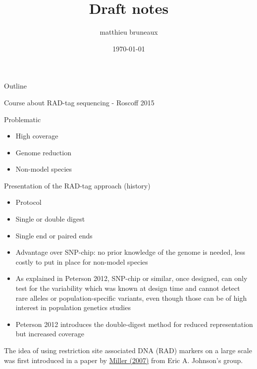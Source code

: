 \documentclass[presentation]{beamer}
\author{matthieu bruneaux}
\date{\today}
\title{Draft notes}
\begin{document}
\maketitle
\begin{frame}{Outline}
\tableofcontents
\end{frame}


\begin{frame}[label=sec-1]{Course about RAD-tag sequencing - Roscoff 2015}
\begin{block}{Problematic}
\begin{itemize}
\item High coverage
\item Genome reduction
\item Non-model species
\end{itemize}
\end{block}
\begin{block}{Presentation of the RAD-tag approach (history)}
\begin{itemize}
\item Protocol
\item Single or double digest
\item Single end or paired ends
\item Advantage over SNP-chip: no prior knowledge of the genome is needed, less
costly to put in place for non-model species
\item As explained in Peterson 2012, SNP-chip or similar, once designed, can only
test for the variability which was known at design time and cannot detect
rare alleles or population-specific variants, even though those can be of
high interest in population genetics studies
\item Peterson 2012 introduces the double-digest method for reduced representation
but increased coverage
\end{itemize}

The idea of using restriction site associated DNA (RAD) markers on a large
scale was first introduced in a paper by \href{http://genome.cshlp.org/content/17/2/240.long}{Miller (2007)} from Eric
A. Johnson's group.


\end{block}
\end{frame}
\end{document}

